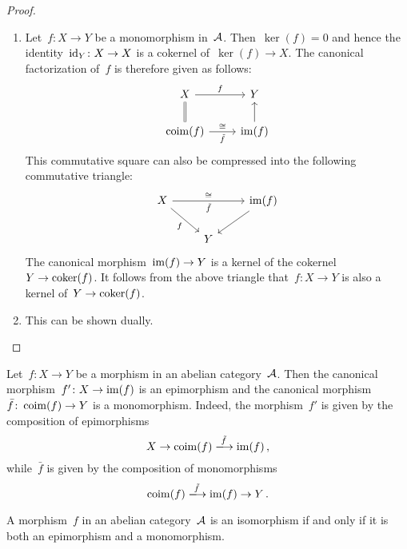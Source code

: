 \begin{proof}
  \leavevmode
  \begin{enumerate}
    \item
      Let~$f \colon X \to Y$ be a monomorphism in~$\mathcal{A}$.
      Then~$\ker(f) = 0$ and hence the identity~$\operatorname{id}_Y \colon X \to X$ is a cokernel of~$\ker(f) \to X$.
      The canonical factorization of~$f$ is therefore given as follows:
      \[
        \begin{tikzcd}
            X
            \arrow{r}[above]{f}
            \arrow[equal]{d}
          & Y
          \\
            \coim(f)
            \arrow{r}[above]{\cong}[below]{\tilde{f}}
          & \im(f)
            \arrow{u}
        \end{tikzcd}
      \]
      This commutative square can also be compressed into the following commutative triangle:
      \[
        \begin{tikzcd}
            X
            \arrow{rr}[above]{\cong}[below]{\tilde{f}}
            \arrow{dr}[below left]{f}
          & {}
          & \im(f)
            \arrow{dl}
          \\
            {}
          & Y
          & {}
        \end{tikzcd}
      \]
      The canonical morphism~$\operatorname{im}(f) \to Y$ is a kernel of the cokernel~$Y \to \operatorname{coker}(f)$.
      It follows from the above triangle that~$f \colon X \to Y$ is also a kernel of~$Y \to \operatorname{coker}(f)$.
    \item
      This can be shown dually.
    \qedhere
  \end{enumerate}
\end{proof}


\begin{remark}
  Let~$f \colon X \to Y$ be a morphism in an abelian category~$\mathcal{A}$.
  Then the canonical morphism~$f' \colon X \to \operatorname{im}(f)$ is an epimorphism and the canonical morphism~$\bar{f} \colon \operatorname{coim}(f) \to Y$ is a monomorphism.
  Indeed, the morphism~$f'$ is given by the composition of epimorphisms
  \[
    X
    \to
    \coim(f)
    \xlongto{\tilde{f}}
    \im(f) \,,
  \]
  while~$\bar{f}$ is given by the composition of monomorphisms
  \[
    \coim(f)
    \xlongto{\tilde{f}}
    \im(f)
    \to
    Y \,.
  \]
\end{remark}


\begin{proposition}
  \label{iso iff epi and mono}
  A morphism~$f$ in an abelian category~$\mathcal{A}$ is an isomorphism if and only if it is both an epimorphism and a monomorphism.
\end{proposition}


